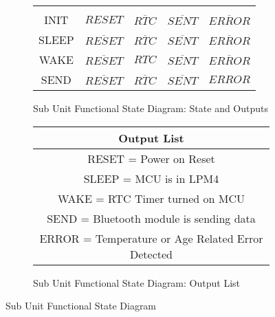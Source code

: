 \begin{center}
\begin{landscape}
\begin{figure}[!ht]
\begin{subfigure}[b]{0.5\textwidth}
\begin{tabular}{c|cccc}
        \hline
        &&&\\
        INIT&$RESET$&$\overline{RTC}$&$\overline{SENT}$&$\overline{ERROR}$\\
        SLEEP&$\overline{RESET}$&$\overline{RTC}$&$\overline{SENT}$&$\overline{ERROR}$\\
        WAKE&$\overline{RESET}$&$RTC$&$\overline{SENT}$&$\overline{ERROR}$\\
        SEND&$\overline{RESET}$&$\overline{RTC}$&$\overline{SENT}$&$ERROR$\\
      \end{tabular}
      \caption{Sub Unit Functional State Diagram: State and Outputs}
      \label{fig:sub-unit-fsd-state-outputs}
  \end{subfigure}
  \begin{subfigure}[b]{0.5\textwidth}
   \begin{tabular}{|c|}
    \hline
     Output List\\
    \hline
     RESET = Power on Reset\\
     SLEEP = MCU is in LPM4\\
     WAKE = RTC Timer turned on MCU\\
     SEND = Bluetooth module is sending data\\
     ERROR = Temperature or Age Related Error Detected\\
    \hline
   \end{tabular}
      \caption{Sub Unit Functional State Diagram: Output List}
      \label{fig:sub-unit-fsd-outputs-list}
  \end{subfigure}
\caption{Sub Unit Functional State Diagram}
\label{fig:sub-unit-fsd}
\end{figure}
\end{landscape}
\end{center}
